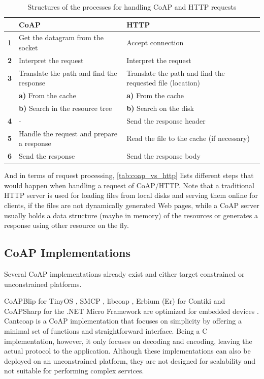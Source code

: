 \begin{table}[!htbp]
\centering
\begin{tabular}{lll}
%
 & \bfseries CoAP &  \bfseries HTTP \\ \hline
\bfseries 1 & Get the datagram from the socket & Accept connection \\
\bfseries 2 & Interpret the request & Interpret the request \\
\bfseries 3 & Translate the path and find the response & Translate the path and find the requested file (location) \\
%
& \textbf{a)} From the cache & \textbf{a)} From the cache \\
%
& \textbf{b)} Search in the resource tree & \textbf{b)} Search on the disk \\
\bfseries 4 & - & Send the response header \\
\bfseries 5 & Handle the request and prepare a response & Read the file to the cache (if necessary) \\
\bfseries 6 & Send the response & Send the response body \\
\end{tabular}
\caption{Structures of the processes for handling CoAP and HTTP requests}
\label{tab:coap_vs_http}
\end{table}

And in terms of request processing, \autoref{tab:coap_vs_http} \cite{lanter2013scalability} lists different steps that would happen when handling a request of CoAP/HTTP. Note that a traditional HTTP server is used for loading files from local disks and serving them online for clients, if the files are not dynamically generated Web pages, while a CoAP server usually holds a data structure (maybe in memory) of the resources or generates a response using other resource on the fly.  

\subsection{CoAP Implementations}\label{CoAP_imp}

Several CoAP implementations already exist and either target constrained or unconstrained platforms. 

CoAPBlip for TinyOS \cite{6208761}, SMCP \cite{SMCP}, libcoap \cite{kuladinithi2011implementation}, Erbium (Er) for Contiki \cite{kovatsch2011low} and CoAPSharp \cite{coapsharp} for the .NET Micro Framework are optimized for embedded devices \cite{lanter2013scalability}. Cantcoap \cite{cantcoap} is a CoAP implementation that focuses on simplicity by offering a minimal set of functions and straightforward interface. Being a C implementation, however, it only focuses on decoding and encoding, leaving the actual protocol to the application. Although these implementations can also be deployed on an unconstrained platform, they are not designed for scalability and not suitable for performing complex services.

